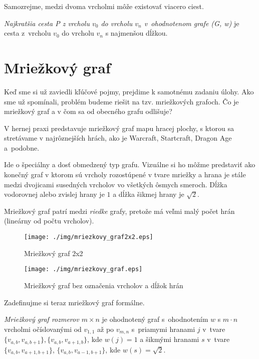Samozrejme, medzi dvoma vrcholmi môže existovať viacero ciest.

\begin{define}
{\sl Najkratšia cesta P z vrcholu $v_0$ do vrcholu $v_n$
v~ohodnotenom grafe (G, w)} 
je cesta z~vrcholu $v_0$ do vrcholu $v_n$ s najmenšou dĺžkou. 
\end{define}


\section{Mriežkový graf}

Keď sme si už zaviedli kľúčové pojmy, prejdime k samotnému
zadaniu úlohy.
Ako sme už spomínali, problém budeme riešit na tzv. mriežkových grafoch. Čo je mriežkový graf a v čom sa od obecného grafu odlišuje?

V hernej praxi predstavuje mriežkový graf mapu hracej plochy, s ktorou sa stretávame v najrôznejších hrách, ako je Warcraft, Startcraft, Dragon Age \cite{sturtevant2012benchmarks}
a~podobne.

Ide o špeciálny a dosť obmedzený typ grafu. Vizuálne si ho môžme predstaviť ako konečný graf v ktorom sú vrcholy rozostúpené v tvare mriežky a hrana
je stále medzi dvojicami susedných vrcholov vo všetkých ôsmych smeroch. Dĺžka vodorovnej alebo zvislej hrany je $1$ a dĺžka šikmej hrany je $\sqrt{2}$.

\begin{note}
Mriežkový graf patrí medzi {\sl riedke} grafy,
pretože má veľmi malý počet hrán (lineárny od počtu vrcholov).
\end{note}


\begin{figure}[h]
\centering
\texttt{[image: ./img/mriezkovy\_graf2x2.eps]}
\caption{Mriežkový graf 2x2}
\label{fig:mriezkovy_graf2x2}
\end{figure}


\begin{figure}[h]
\centering
\texttt{[image: ./img/mriezkovy\_graf.eps]}
\caption{Mriežkový graf bez označenia vrcholov a dĺžok hrán}
\label{fig:mriezkovy_graf}
\end{figure}


Zadefinujme si teraz mriežkový graf formálne.

\begin{define}
{\sl Mriežkový graf rozmerov $m \times n$} je ohodnotený graf s~ohodnotením $w$ s $m \cdot n$ vrcholmi očíslovanými od $v_{1,1}$ až po $v_{m,n}$ 
s~priamymi hranami $j$ v~tvare $\{v_{a,b}, v_{a,b+1}\}, \{v_{a,b}, v_{a+1,b}\}$, kde $w(j) = 1$ 
a šikmými hranami $ s $ v~tvare 
$\{v_{a,b}, v_{a+1,b+1}\}$, $\{v_{a,b}, v_{a-1,b+1}\}$, kde $ w(s) = \sqrt{2}$.
\end{define}

